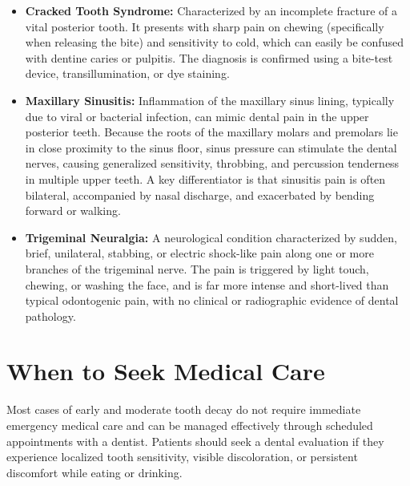 \begin{itemize}
    \item \textbf{Cracked Tooth Syndrome:} Characterized by an incomplete fracture of a vital posterior tooth. It presents with sharp pain on chewing (specifically when releasing the bite) and sensitivity to cold, which can easily be confused with dentine caries or pulpitis. The diagnosis is confirmed using a bite-test device, transillumination, or dye staining.
    \item \textbf{Maxillary Sinusitis:} Inflammation of the maxillary sinus lining, typically due to viral or bacterial infection, can mimic dental pain in the upper posterior teeth. Because the roots of the maxillary molars and premolars lie in close proximity to the sinus floor, sinus pressure can stimulate the dental nerves, causing generalized sensitivity, throbbing, and percussion tenderness in multiple upper teeth. A key differentiator is that sinusitis pain is often bilateral, accompanied by nasal discharge, and exacerbated by bending forward or walking.
    \item \textbf{Trigeminal Neuralgia:} A neurological condition characterized by sudden, brief, unilateral, stabbing, or electric shock-like pain along one or more branches of the trigeminal nerve. The pain is triggered by light touch, chewing, or washing the face, and is far more intense and short-lived than typical odontogenic pain, with no clinical or radiographic evidence of dental pathology.
\end{itemize}

\section*{When to Seek Medical Care}
Most cases of early and moderate tooth decay do not require immediate emergency medical care and can be managed effectively through scheduled appointments with a dentist. Patients should seek a dental evaluation if they experience localized tooth sensitivity, visible discoloration, or persistent discomfort while eating or drinking.

